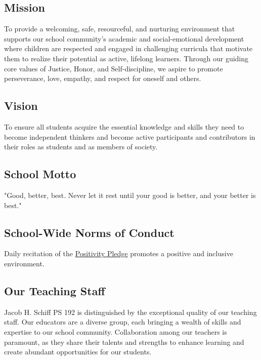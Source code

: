 \documentclass[11pt]{article}
\begin{document}
\subsection{Mission}
\label{sec:orgb8bb85f}
To provide a welcoming, safe, resourceful, and nurturing environment that supports our school community's academic and social-emotional development where children are respected and engaged in challenging curricula that motivate them to realize their potential as active, lifelong learners. Through our guiding core values of Justice, Honor, and Self-discipline, we aspire to promote perseverance, love, empathy, and respect for oneself and others.

\subsection{Vision}
\label{sec:org240dcfa}
To ensure all students acquire the essential knowledge and skills they need to become independent thinkers and become active participants and contributors in their roles as students and as members of society.

\subsection{School Motto}
\label{sec:orgd089380}

"Good, better, best. Never let it rest until your good is better, and your better is best."

\subsection{School-Wide Norms of Conduct}
\label{sec:org0c4f2ad}
Daily recitation of the \href{https://www.ps192.org/apps/pages/index.jsp?uREC\_ID=1504973\&type=d\&pREC\_ID=2371090}{Positivity Pledge} promotes a positive and inclusive environment.

\subsection{Our Teaching Staff}
\label{sec:org8c35821}
Jacob H. Schiff PS 192 is distinguished by the exceptional quality of our teaching staff. Our educators are a diverse group, each bringing a wealth of skills and expertise to our school community. Collaboration among our teachers is paramount, as they share their talents and strengths to enhance learning and create abundant opportunities for our students.
\end{document}
